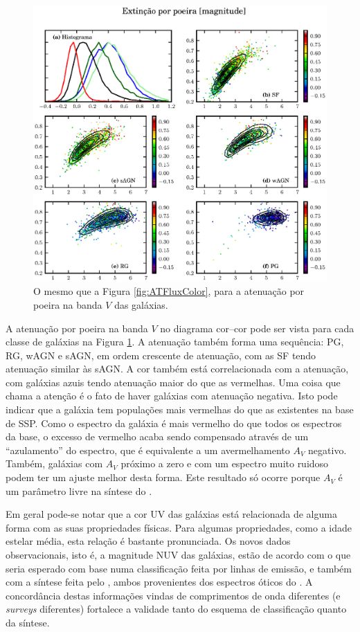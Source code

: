 \begin{figure}
	\includegraphics{figuras/uvcolor-color-AV-byclass.eps}
	\caption[Atenuação por poeira no diagrama cor--cor.]
	{O mesmo que a Figura \ref{fig:ATFluxColor}, para a atenuação por
	poeira na banda $V$ das galáxias.}
	\label{fig:AVColor}
\end{figure}

A atenuação por poeira na banda $V$ no diagrama cor--cor pode ser vista para
cada classe de galáxias na Figura \ref{fig:AVColor}. A atenuação também forma
uma sequência: PG, RG, wAGN e sAGN, em ordem crescente de atenuação, com as SF
tendo atenuação similar às sAGN. A cor também está correlacionada com a
atenuação, com galáxias azuis tendo atenuação maior do que as vermelhas. Uma
coisa que chama a atenção é o fato de haver galáxias com atenuação negativa.
Isto pode indicar que a galáxia tem populações mais vermelhas do que as
existentes na base de SSP. Como o espectro da galáxia é mais vermelho do que
todos os espectros da base, o excesso de vermelho acaba sendo compensado através
de um ``azulamento'' do espectro, que é equivalente a um avermelhamento $A_V$
negativo. Também, galáxias com $A_V$ próximo a zero e com um espectro muito
ruidoso podem ter um ajuste melhor desta forma. Este resultado só ocorre porque
$A_V$ é um parâmetro livre na síntese do \starlight.

Em geral pode-se notar que a cor UV das galáxias está relacionada de alguma
forma com as suas propriedades físicas. Para algumas propriedades, como a idade
estelar média, esta relação é bastante pronunciada. Os novos dados
observacionais, isto é, a magnitude NUV das galáxias, estão de acordo com o que
seria esperado com base numa classificação feita por linhas de emissão, e também
com a síntese feita pelo \starlight, ambos provenientes dos espectros óticos do
\SDSS. A concordância destas informações vindas de comprimentos de onda
diferentes (e {\em surveys} diferentes) fortalece a validade tanto do esquema de
classificação quanto da síntese.


